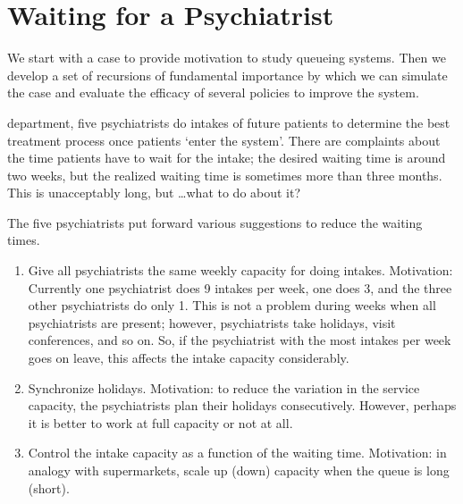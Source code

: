 \documentclass[stochastic-or.tex]{subfiles}
\begin{document}
\section{Waiting for a Psychiatrist}
\label{sec:constr-discr-time}


We start with a case to provide motivation to study queueing systems.
Then we develop a set of recursions of fundamental importance by which we can simulate the case and evaluate the efficacy of several policies to improve the system.



 department, five psychiatrists do intakes of future patients to determine the best treatment process once patients `enter the system'.
There are complaints about the time patients have to wait for the intake; the desired waiting time is around two weeks, but the realized waiting time is sometimes more than three months.
This is  unacceptably long, but \ldots what to do about it?

The five psychiatrists  put forward various suggestions to reduce the waiting times.
\begin{enumerate}
\item Give all psychiatrists the same weekly capacity for doing intakes.
  Motivation: Currently one psychiatrist does 9 intakes per week, one does 3, and the three other psychiatrists do only 1.
  This is not a problem during weeks when all psychiatrists are present; however, psychiatrists take holidays, visit conferences, and so on.
  So, if the psychiatrist with the most intakes per week goes on leave, this affects the intake capacity considerably.
\item Synchronize holidays.
  Motivation: to reduce the variation in the service capacity, the psychiatrists plan their holidays consecutively.
  However, perhaps it is better to work at full capacity or not at all.
\item Control  the intake capacity as a function of the waiting time.
 Motivation: in analogy with supermarkets,  scale up (down) capacity when the queue is long (short).
\end{enumerate}
\end{document}
